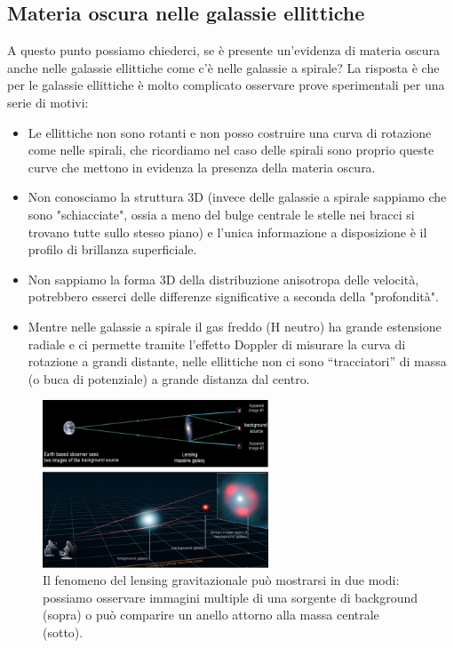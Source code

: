 \subsection{Materia oscura nelle galassie ellittiche} \label{sec:materia-oscura-ellittiche}
A questo punto possiamo chiederci, se è presente un'evidenza di materia oscura anche nelle galassie ellittiche come c’è nelle galassie a spirale? La risposta è che per le galassie ellittiche è molto complicato osservare prove sperimentali per una serie di motivi:
\begin{itemize}
    \item Le ellittiche non sono rotanti e non posso costruire una curva di rotazione come nelle spirali, che ricordiamo nel caso delle spirali sono proprio queste curve che mettono in evidenza la presenza della materia oscura.
    \item Non conosciamo la struttura 3D (invece delle galassie a spirale sappiamo che sono "schiacciate", ossia a meno del bulge centrale le stelle nei bracci si trovano tutte sullo stesso piano) e l’unica informazione a disposizione è il profilo di brillanza superficiale.
    \item Non sappiamo la forma 3D della distribuzione anisotropa delle velocità, potrebbero esserci delle differenze significative a seconda della "profondità".
    \item Mentre nelle galassie a spirale il gas freddo (H neutro) ha grande estensione radiale e ci permette tramite l'effetto Doppler di misurare la curva di rotazione a grandi distante, nelle ellittiche non ci sono “tracciatori” di massa (o buca di potenziale) a grande distanza dal centro.
\end{itemize} 

\begin{figure}
    \centering
    \includegraphics[width=0.6\textwidth]{immagini/gravitational-lensing.png}
    \caption{Il fenomeno del lensing gravitazionale può mostrarsi in due modi: possiamo osservare immagini multiple di una sorgente di background (sopra) o può comparire un anello attorno alla massa centrale (sotto).}
    \label{fig:gravitational-lensing}
\end{figure}


